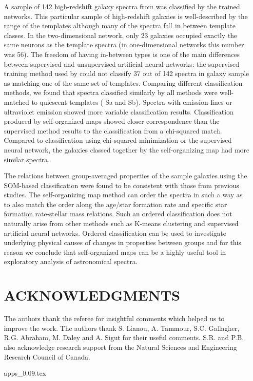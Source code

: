 \documentclass[useAMS,usenatbib]{mn2e}
\begin{document}
    A sample of 142 high-redshift galaxy spectra from  was classified by the trained networks.
  This particular sample of high-redshift galaxies is well-described by the range of the  templates although many of the spectra fall in between template classes.
     In the two-dimensional network, only 23 galaxies occupied exactly the same neurons as the  template spectra (in one-dimensional networks this number was 56).
 The freedom of having in-between types is one of the main differences between supervised and unsupervised artificial neural networks: the supervised training method used by       could not classify 37 out of 142 spectra in galaxy sample as matching one of the same set of templates.
    Comparing different classification methods, we found that spectra classified similarly by all methods were well-matched to quiescent templates ( Sa and Sb). Spectra with emission lines or ultraviolet emission showed more variable classification results.
    Classification produced by self-organized maps showed closer correspondence than the supervised method results to the classification from a chi-squared match.
    Compared to classification using chi-squared minimization or the supervised neural network, the galaxies classed together by the self-organizing map had more similar spectra.


The relations between group-averaged properties of the sample galaxies using the SOM-based classification were found to be consistent with those from previous studies. 
    The self-organizing map method can order the spectra in such a way as to also match the order along the age/star formation rate and specific star formation rate-stellar mass relations.
    Such an ordered classification does not naturally arise from other methods such as K-means clustering and supervised artificial neural networks.
    Ordered classification can be used to investigate underlying physical causes of changes in properties between groups and for this reason we conclude that self-organized maps can be a highly useful tool in exploratory analysis of astronomical spectra.


\section*{ACKNOWLEDGMENTS}
The authors thank the referee for insightful comments which helped us to improve the work.
The authors thank S. Lianou, A. Tammour, S.C. Gallagher, R.G. Abraham, M. Daley and A. Sigut for their useful comments. 
S.R. and P.B. also acknowledge research support from the Natural Sciences and Engineering Research Council of Canada. 




{apps_0.09.tex}
\end{document}
